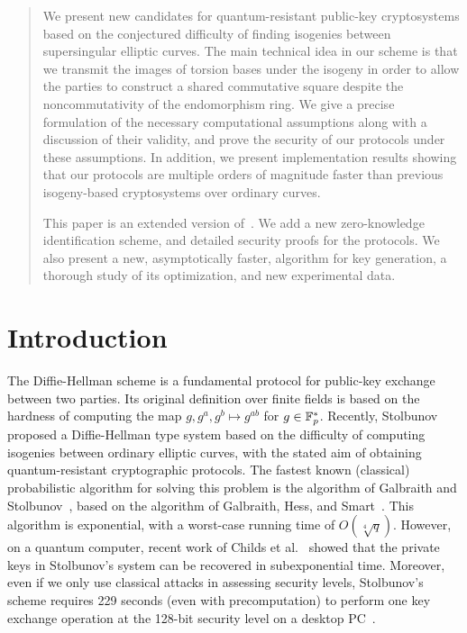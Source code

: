 \begin{abstract}
We present new candidates for quantum-resistant public-key
cryptosystems based on the conjectured difficulty of finding isogenies
between supersingular elliptic curves.  The main technical idea in our
scheme is that we transmit the images of torsion bases under the isogeny
in order to allow the parties to construct a shared commutative square
despite the noncommutativity of the endomorphism ring.
We give a precise formulation of the necessary computational assumptions
along with a discussion of their validity, and prove the
security of our
protocols under these assumptions. In addition, we present implementation
results showing that our protocols are multiple orders of magnitude faster
than previous isogeny-based cryptosystems over ordinary curves.

This paper is an extended version of~\cite{pqcrypto}. We add a new
zero-knowledge identification scheme, and detailed security proofs for
the protocols. We also present a new, asymptotically faster, algorithm
for key generation, a thorough study of its optimization, and new
experimental data.
\end{abstract}







\section{Introduction}

The Diffie-Hellman scheme is a fundamental protocol for public-key
exchange between two parties. Its original definition over finite
fields is based on the hardness of computing the map $g,g^a,g^b
\mapsto g^{ab}$ for $g \in {\mathbb{F}}_p^*$. Recently, Stolbunov~\cite{Stol}
proposed a Diffie-Hellman type system based on the difficulty of
computing isogenies between ordinary elliptic curves, with the stated
aim of obtaining quantum-resistant cryptographic protocols.  The
fastest known (classical) probabilistic algorithm for solving this
problem is the algorithm of Galbraith and Stolbunov~\cite{gs}, based
on the algorithm of Galbraith, Hess, and Smart~\cite{GHS}. This
algorithm is exponential, with a worst-case running time of
$O(\sqrt[4]{q})$. However, on a quantum computer, recent work of
Childs et al.~\cite{CJS} showed that the private keys in
Stolbunov's system can be recovered in subexponential time. Moreover,
even if we only use classical attacks in assessing security levels,
Stolbunov's scheme requires 229 seconds (even with precomputation) to
perform one key exchange operation at the 128-bit security level on a
desktop PC~\cite[Table 1]{Stol}.

